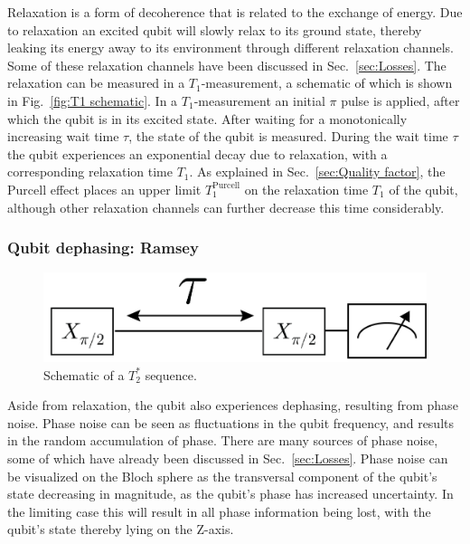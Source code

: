           Relaxation is a form of decoherence that is related to the exchange of energy. Due to relaxation an excited qubit will slowly relax to its ground state, thereby leaking its energy away to its environment through different relaxation channels. Some of these relaxation channels have been discussed in Sec.~\ref{sec:Losses}. The relaxation can be measured in a $T_1$-measurement, a schematic of which is shown in Fig.~\ref{fig:T1 schematic}. In a $T_1$-measurement an initial $\pi$ pulse is applied, after which the qubit is in its excited state. After waiting for a monotonically increasing wait time $\tau$, the state of the qubit is measured. During the wait time $\tau$ the qubit experiences an exponential decay due to relaxation, with a corresponding relaxation time $T_1$. As explained in Sec.~\ref{sec:Quality factor}, the Purcell effect places an upper limit $T_1^\text{Purcell}$ on the relaxation time $T_1$ of the qubit, although other relaxation channels can further decrease this time considerably.

        \subsubsection{Qubit dephasing: Ramsey}
          \label{sssec:Ramsey}

          \begin{figure}
            \begin{center}
            \vspace{-30pt}
              \includegraphics[width=\textwidth]{Figures/Qubit characterization/T2 decoherence.png}
            \end{center}
            \vspace{-20 pt}
            \caption{Schematic of a $T_2^*$ sequence.}
            \label{fig:T2star schematic}
          \end{figure}

          Aside from relaxation, the qubit also experiences dephasing, resulting from phase noise. Phase noise can be seen as fluctuations in the qubit frequency, and results in the random accumulation of phase. There are many sources of phase noise, some of which have already been discussed in Sec.~\ref{sec:Losses}. Phase noise can be visualized on the Bloch sphere as the transversal component of the qubit's state decreasing in magnitude, as the qubit's phase has increased uncertainty. In the limiting case this will result in all phase information being lost, with the qubit's state thereby lying on the Z-axis.

